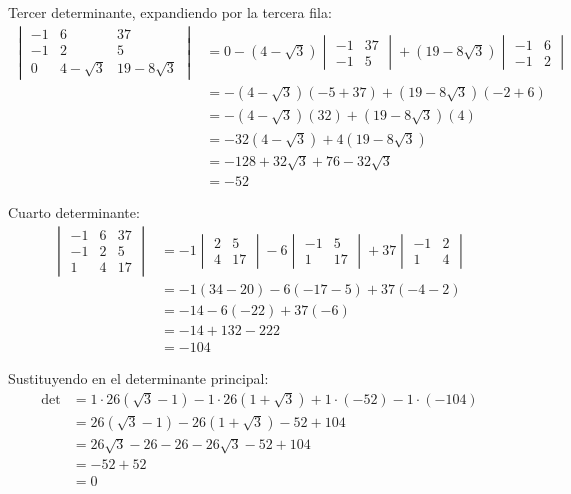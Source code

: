 \documentclass{article}
\begin{document}
Tercer determinante, expandiendo por la tercera fila:
\begin{align}
\begin{vmatrix}
-1 & 6 & 37 \\
-1 & 2 & 5 \\
0 & 4-\sqrt{3} & 19-8\sqrt{3}
\end{vmatrix} &= 0 - (4-\sqrt{3}) \begin{vmatrix} -1 & 37 \\ -1 & 5 \end{vmatrix} + (19-8\sqrt{3}) \begin{vmatrix} -1 & 6 \\ -1 & 2 \end{vmatrix} \\
&= -(4-\sqrt{3})(-5+37) + (19-8\sqrt{3})(-2+6) \\
&= -(4-\sqrt{3})(32) + (19-8\sqrt{3})(4) \\
&= -32(4-\sqrt{3}) + 4(19-8\sqrt{3}) \\
&= -128 + 32\sqrt{3} + 76 - 32\sqrt{3} \\
&= -52
\end{align}

Cuarto determinante:
\begin{align}
\begin{vmatrix}
-1 & 6 & 37 \\
-1 & 2 & 5 \\
1 & 4 & 17
\end{vmatrix} &= -1 \begin{vmatrix} 2 & 5 \\ 4 & 17 \end{vmatrix} - 6 \begin{vmatrix} -1 & 5 \\ 1 & 17 \end{vmatrix} + 37 \begin{vmatrix} -1 & 2 \\ 1 & 4 \end{vmatrix} \\
&= -1(34-20) - 6(-17-5) + 37(-4-2) \\
&= -14 - 6(-22) + 37(-6) \\
&= -14 + 132 - 222 \\
&= -104
\end{align}

Sustituyendo en el determinante principal:
\begin{align}
\det &= 1 \cdot 26(\sqrt{3} - 1) - 1 \cdot 26(1 + \sqrt{3}) + 1 \cdot (-52) - 1 \cdot (-104) \\
&= 26(\sqrt{3} - 1) - 26(1 + \sqrt{3}) - 52 + 104 \\
&= 26\sqrt{3} - 26 - 26 - 26\sqrt{3} - 52 + 104 \\
&= -52 + 52 \\
&= 0
\end{align}
\end{document}
